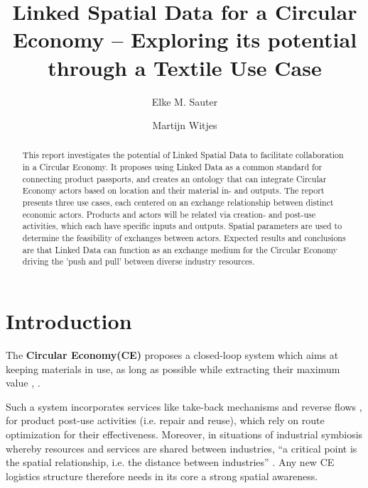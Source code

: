 \documentclass[runningheads,a4paper]{llncs}
\begin{document}
\mainmatter

\title{Linked Spatial Data for a Circular Economy -- Exploring its potential through a Textile Use Case}
\author{Elke M. Sauter \and
Martijn Witjes}

\maketitle

\begin{abstract}
This report investigates the potential of Linked Spatial Data to facilitate collaboration in a Circular Economy. It proposes using Linked Data as a common standard for connecting product passports, and creates an ontology that can integrate Circular Economy actors based on location and their material in- and outputs. The report presents three use cases, each centered on an exchange relationship between distinct economic actors. Products and actors will be related via creation- and post-use activities, which each have specific inputs and outputs. Spatial parameters are used to determine the feasibility of exchanges between actors. Expected results and conclusions are that Linked Data can function as an exchange medium for the Circular Economy driving the 'push and pull' between diverse industry resources.

\end{abstract}


\section{Introduction}

The {\bf Circular Economy}{\bf (CE)} proposes a closed-loop system which aims at keeping materials in use, as long as possible while extracting their maximum value  \cite{_Ref490914294},  \cite{_Ref490914304}.

Such a system incorporates services like take-back mechanisms and reverse flows  \cite{_Ref490914370},  \cite{_Ref490914376} for product post-use activities (i.e. repair and reuse), which rely on route optimization for their effectiveness. Moreover, in situations of industrial symbiosis whereby resources and services are shared between industries, ``a critical point is the spatial relationship, i.e. the distance between industries'' \cite{_Ref490914435}. Any new CE logistics structure therefore needs in its core a strong spatial awareness.
\end{document}
